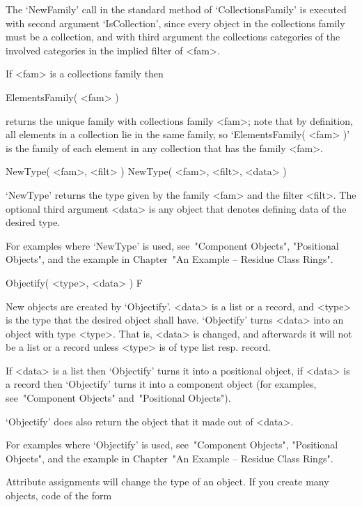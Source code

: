 The `NewFamily' call in the standard method of `CollectionsFamily'
is executed with second argument `IsCollection',
since every object in the collections family must be a collection,
and with third argument the collections categories of the involved
categories in the implied filter of <fam>.

If <fam> is a collections family then

\>ElementsFamily( <fam> )

returns the unique family with collections family <fam>;
note that by definition,
all elements in a collection lie in the same family,
so `ElementsFamily( <fam> )' is the family of each element
in any collection that has the family <fam>.



\>NewType( <fam>, <filt> )
\)\fmark NewType( <fam>, <filt>, <data> )

`NewType' returns the type given by the family <fam>
and the filter <filt>.
The optional third argument <data> is any object that denotes defining
data of the desired type.

For examples where `NewType' is used, see~"Component Objects",
"Positional Objects",
and the example in Chapter~"An Example -- Residue Class Rings".



\>Objectify( <type>, <data> ) F

New objects are created by `Objectify'. <data> is a list or a record, and
<type> is the type that the desired object shall have. `Objectify'  turns
<data> into an object with type <type>. That is, <data> is  changed,  and
afterwards it will not be a list or a record unless  <type>  is  of  type
list resp. record.

If <data> is a list then `Objectify' turns it into a  positional  object,
if <data> is a record then `Objectify' turns it into a  component  object
(for examples, see~"Component Objects" and~"Positional Objects").

`Objectify' does also return the object that it made out of <data>.

For  examples  where  `Objectify'  is  used,   see~"Component   Objects",
"Positional Objects", and the example in Chapter~"An Example  --  Residue
Class Rings".

Attribute assignments will change the type of an object.  If  you  create
many objects, code of the form

